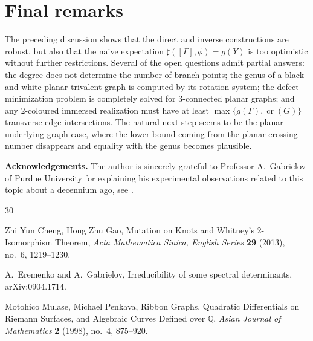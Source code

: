 \documentclass[reqno]{amsart}
\theoremstyle{definition}
\newcommand {\Ga}{\Gamma}
\newcommand \crs {\operatorname{cr}}
\begin{document}
\section{Final remarks}

The preceding discussion shows that the direct and inverse constructions are robust, but also that the naive expectation $\sharp([\Ga],\phi)=g(Y)$ is too optimistic without further restrictions. Several of the open questions admit partial answers: the degree does not determine the number of branch points; the genus of a black-and-white planar trivalent graph is computed by its rotation system; the defect minimization problem is completely solved for $3$-connected planar graphs; and any $2$-coloured immersed realization must have at least $\max\{g(\Ga),\crs(G)\}$ transverse edge intersections. The natural next step seems to be the planar underlying-graph case, where the lower bound coming from the planar crossing number disappears and equality with the genus becomes plausible.

\medskip\noindent
\textbf{Acknowledgements.}
The author is sincerely grateful to Professor A.~Gabrielov of Purdue University for explaining  his experimental observations related to this topic about a decennium ago, see \cite{ErGa}.

\begin{thebibliography}{30}

 Zhi Yun Cheng, Hong Zhu Gao, Mutation on Knots and Whitney's 2-Isomorphism Theorem, \emph{Acta Mathematica Sinica, English Series} \textbf{29} (2013), no.~6, 1219--1230.

 A.~Eremenko and A.~Gabrielov, Irreducibility of some spectral determinants, arXiv:0904.1714.

 Motohico Mulase, Michael Penkava, Ribbon Graphs, Quadratic Differentials on Riemann Surfaces, and Algebraic Curves Defined over $\overline{\mathbb Q}$, \emph{Asian Journal of Mathematics} \textbf{2} (1998), no.~4, 875--920.

\end{thebibliography}
\end{document}
